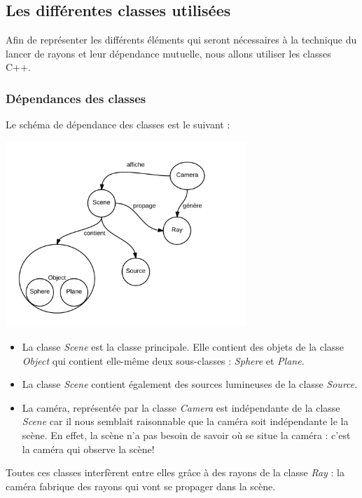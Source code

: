 \documentclass{article}
\begin{document}
		\subsection{Les différentes classes utilisées}

Afin de représenter les différents éléments qui seront nécessaires à la technique du lancer de rayons et leur dépendance mutuelle, nous allons utiliser les classes C++.

\subsubsection{Dépendances des classes}
Le schéma de dépendance des classes est le suivant :
	\begin{center}
    		\includegraphics[height = 7cm]{schema.png}
  		\end{center}

	\begin{itemize}
\item La classe \emph{Scene} est la classe principale. Elle contient des objets de la classe \emph{Object} qui contient elle-même deux sous-classes : \emph{Sphere} et \emph{Plane}. 
\item La classe \emph{Scene} contient également des sources lumineuses de la classe \emph{Source}.
\item La caméra, représentée par la classe \emph{Camera} est indépendante de la classe \emph{Scene} car il nous semblait raisonnable que la caméra soit indépendante le la scène. En effet, la scène n'a pas besoin de savoir où se situe la caméra : c'est la caméra qui observe la scène! 

\end{itemize}
Toutes ces classes interfèrent entre elles grâce à des rayons de la classe \emph{Ray} : la caméra fabrique des rayons qui vont se propager dans la scène. 
\end{document}
